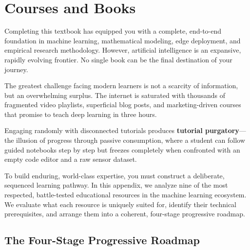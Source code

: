 \chapter{Courses and Books}\label{app:courses_books}

Completing this textbook has equipped you with a complete, end-to-end foundation in machine learning, mathematical modeling, edge deployment, and empirical research methodology. However, artificial intelligence is an expansive, rapidly evolving frontier. No single book can be the final destination of your journey.

The greatest challenge facing modern learners is not a scarcity of information, but an overwhelming surplus. The internet is saturated with thousands of fragmented video playlists, superficial blog posts, and marketing-driven courses that promise to teach deep learning in three hours. 

Engaging randomly with disconnected tutorials produces \textbf{tutorial purgatory}---the illusion of progress through passive consumption, where a student can follow guided notebooks step by step but freezes completely when confronted with an empty code editor and a raw sensor dataset.

To build enduring, world-class expertise, you must construct a deliberate, sequenced learning pathway. In this appendix, we analyze nine of the most respected, battle-tested educational resources in the machine learning ecosystem. We evaluate what each resource is uniquely suited for, identify their technical prerequisites, and arrange them into a coherent, four-stage progressive roadmap.

\section{The Four-Stage Progressive Roadmap}\label{sec:roadmap_stages}

